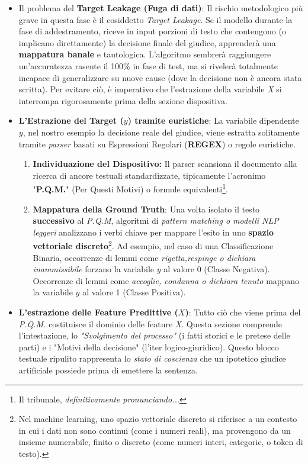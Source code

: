 \documentclass{article}
\begin{document}
\begin{itemize}
    \item Il problema del \textbf{Target Leakage (Fuga di dati)}: Il rischio metodologico più grave in questa fase è il cosiddetto \textit{Target Leakage}. Se il modello durante la fase di addestramento, riceve in input porzioni di testo che contengono (o implicano direttamente) la decisione finale del giudice, apprenderà una \textbf{mappatura banale} e tautologica. L'algoritmo sembrerà raggiungere un'accuratezza rasente il 100\% in fase di test, ma si rivelerà totalmente incapace di generalizzare su nuove cause (dove la decisione non è ancora stata scritta). Per evitare ciò, è imperativo che l'estrazione della variabile \textit{X} si interrompa rigorosamente prima della sezione dispositiva.

    \item \textbf{L'Estrazione del Target ($y$) tramite euristiche}: La variabile dipendente $y$, nel nostro esempio la decisione reale del giudice, viene estratta solitamente tramite \textit{parser} basati su Espressioni Regolari (\textbf{REGEX}) o regole euristiche.
    \begin{enumerate}
        \item \textbf{Individuazione del Dispositivo:} Il parser scansiona il documento alla ricerca di ancore testuali standardizzate, tipicamente l'acronimo "\textbf{P.Q.M.}" (Per Questi Motivi) o formule equivalenti\footnote{Il tribunale, \textit{definitivamente pronunciando...}}.

        \item \textbf{Mappatura della Ground Truth}: Una volta isolato il testo \textbf{successivo} al \textit{P.Q.M}, algoritmi di \textit{pattern matching o modelli NLP leggeri} analizzano i verbi chiave per mappare l'esito in uno \textbf{spazio vettoriale discreto}\footnote{Nel machine learning, uno spazio vettoriale discreto si riferisce a un contesto in cui i dati non sono continui (come i numeri reali), ma provengono da un insieme numerabile, finito o discreto (come numeri interi, categorie, o token di testo).}. Ad esempio, nel caso di una Classificazione Binaria, occorrenze di lemmi come \textit{rigetta,respinge o dichiara inammissibile} forzano la variabile $y$ al valore 0 (Classe Negativa). Occorrenze di lemmi come \textit{accoglie, condanna o dichiara tenuto} mappano la variabile $y$ al valore 1 (Classe Positiva).
    \end{enumerate}

\item \textbf{L'estrazione delle Feature Predittive ($X$)}: Tutto ciò che viene prima del \textit{P.Q.M.} costituisce il dominio delle feature \textit{X}. Questa sezione comprende l'intestazione, lo \textit{"Svolgimento del processo"} (i fatti storici e le pretese delle parti) e i "Motivi della decisione" (l'iter logico-giuridico). Questo blocco testuale ripulito rappresenta lo \textit{stato di coscienza} che un ipotetico giudice artificiale possiede prima di emettere la sentenza.
\end{itemize}
\end{document}
